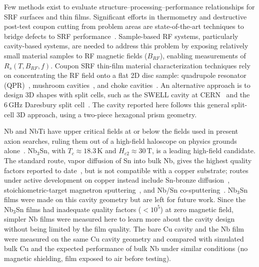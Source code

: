 \documentclass[letterpaper,journal]{IEEEtran}
\newcommand{\SI}[2]{\ensuremath{#1\,\text{#2}}}
\newcommand{\kelvin}{K}
\newcommand{\tesla}{T}
\begin{document}
Few methods exist to evaluate structure--processing--performance relationships for SRF surfaces and thin films. Significant efforts in thermometry and destructive post-test coupon cutting from problem areas are state-of-the-art techniques to bridge defects to SRF performance~\cite{knobloch1995thermometry, trenikhinaSRF2013, ciovatiAnlageGurevich2013, posenTrenikhina2017NbSnPerformance, bianchiVenturiniDelsolaro2023, geCooley2011Replica}. Sample-based RF systems, particularly cavity-based systems, are needed to address this problem by exposing relatively small material samples to RF magnetic fields ($B_{RF}$), enabling measurements of $R_s(T, B_{RF}, f)$. Coupon SRF thin-film material characterization techniques rely on concentrating the RF field onto a flat 2D disc sample: quadrupole resonator (QPR)~\cite{del2018redesign, monroy2019design,ge2026design,zhao2026multiphysics}, mushroom cavities~\cite{nantista2005test,xie2013development,maniscalco2016new}, and choke cavities~\cite{seal2024high}. An alternative approach is to design 3D shapes with split cells, such as the SWELL cavity at CERN~\cite{peaugerSWELL2022} and the 6\,GHz Daresbury split cell~\cite{leicesterSplit6GHz2023}. The cavity reported here follows this general split-cell 3D approach, using a two-piece hexagonal prism geometry.

Nb and NbTi have upper critical fields at or below the fields used in present axion searches, ruling them out of a high-field haloscope on physics grounds alone~\cite{gurevichUseNotUse2011}. Nb$_3$Sn, with $T_c \approx \SI{18.3}{\kelvin}$ and $H_{c2}\approx\SI{30}{\tesla}$, is a leading high-field candidate. The standard route, vapor diffusion of Sn into bulk Nb, gives the highest quality factors reported to date~\cite{posenNb3SnSuperconductingRadiofrequency2017}, but is not compatible with a copper substrate; routes under active development on copper instead include Sn-bronze diffusion~\cite{withanageRapidNbSn2021, juliaoNb3SnThesis2026, luCuBronzeQPR2026}, stoichiometric-target magnetron sputtering~\cite{fonnesuRecipeOptimizationSRF2025}, and Nb/Sn co-sputtering~\cite{sayeedFabricationSuperconductingNb3Sn2023}. Nb$_3$Sn films were made on this cavity geometry but are left for future work. Since the Nb$_3$Sn films had inadequate quality factors ($< 10^5$) at zero magnetic field, simpler Nb films were measured here to learn more about the cavity design without being limited by the film quality. The bare Cu cavity and the Nb film were measured on the same Cu cavity geometry and compared with simulated bulk Cu and the expected performance of bulk Nb under similar conditions (no magnetic shielding, film exposed to air before testing).
\end{document}
